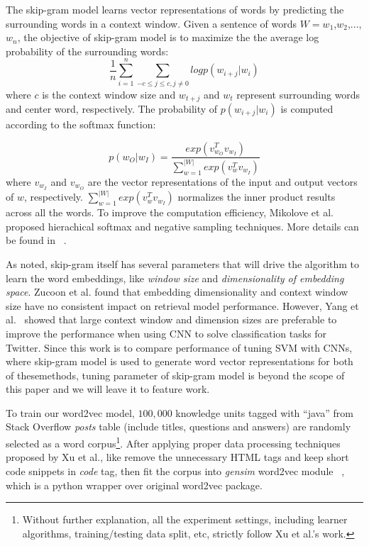\documentclass[sigconf,review, anonymous]{acmart}
\theoremstyle{break}
\begin{document}
The skip-gram model learns vector representations of words
 by predicting the surrounding words in a context window. 
 Given a sentence of words $W =w_1$,$w_2$,...,$w_n$, the objective of skip-gram model is to maximize the
 the average log probability of the surrounding words:
 \begin{equation*}
 \frac{1}{n}\sum_{i=1}^{n} \sum_{-c\leq j \leq c, j \neq 0} log p(w_{i+j}|w_i)
\end{equation*}
where $c$ is the context window size and $w_{t+j}$ and $w_{t}$ represent surrounding words and center word, respectively.
The probability of $p(w_{i+j}|w_i)$ is computed according to the softmax function:

\begin{equation*}
p(w_O|w_I) = \frac{exp(v_{w_O}^Tv_{w_I})}{\sum_{w=1}^{|W|}exp(v_{w}^Tv_{w_I})}
\end{equation*}
where $v_{w_I}$ and $v_{w_O}$ are the vector representations of the input and output vectors of $w$, respectively. 
$\sum_{w=1}^{|W|}exp(v_{w}^Tv_{w_I})$  normalizes the inner product results across all the words.
To improve the computation efficiency, Mikolove et al. \cite{mikolov2013distributed} proposed
hierachical softmax and negative sampling
techniques. More details can be found in ~\cite{mikolov2013distributed}.

As noted, skip-gram itself has several parameters that will drive the algorithm 
to learn the word embeddings,  like {\it window size} and {\it dimensionality of embedding space}. 
Zucoon et al. \cite{zuccon2015integrating} found that embedding dimensionality
and context window size have no consistent impact on retrieval model performance. However,
Yang et al.~\cite{yang2016using} showed that large context window and dimension
 sizes are preferable to improve the performance when using CNN to solve  classification tasks
 for Twitter. Since this work is to compare performance of  tuning SVM  with CNNs, where
 skip-gram model is used to generate word vector representations for both of thesemethods, 
 tuning parameter of skip-gram model is beyond the scope of this paper and we will leave it to feature work.
 
 

To train our word2vec model, $100,000$ knowledge units tagged with ``java'' from
Stack Overflow {\it posts} table  (include titles, questions and answers)
are randomly selected as a word corpus\footnote{Without further explanation, 
all the experiment settings, including learner algorithms,
training/testing data split, etc, strictly follow Xu et al.'s work. }. 
After applying proper data processing techniques proposed by Xu et al., like
 remove the unnecessary HTML tags and keep short code snippets in
{\it code} tag, then fit the corpus into {\it gensim} word2vec module ~\cite{rehurek_lrec},
which is a python wrapper over original word2vec package.
\end{document}
